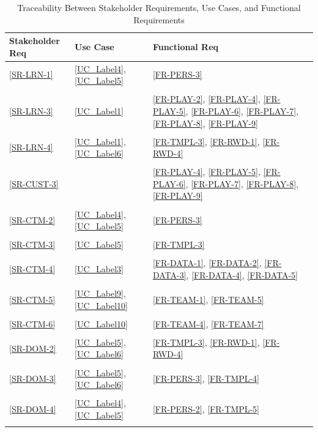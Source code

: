 \documentclass[12pt]{article}
\begin{document}
\begin{longtable}{p{} p{} p{} p{}}

\toprule
Stakeholder Req & Use Case & Functional Req \\
\midrule
\ref{SR-LRN-1} & \ref{UC_Label4}, \ref{UC_Label5} & \ref{FR-PERS-3} \\
\\
\ref{SR-LRN-3} & \ref{UC_Label1} & \ref{FR-PLAY-2}, \ref{FR-PLAY-4}, \ref{FR-PLAY-5}, \ref{FR-PLAY-6}, \ref{FR-PLAY-7}, \ref{FR-PLAY-8}, \ref{FR-PLAY-9} \\
\\
\ref{SR-LRN-4} & \ref{UC_Label1}, \ref{UC_Label6} & \ref{FR-TMPL-3}, \ref{FR-RWD-1}, \ref{FR-RWD-4} \\
\\
\ref{SR-CUST-3} &  & \ref{FR-PLAY-4}, \ref{FR-PLAY-5}, \ref{FR-PLAY-6}, \ref{FR-PLAY-7}, \ref{FR-PLAY-8}, \ref{FR-PLAY-9} \\
\\
\ref{SR-CTM-2} & \ref{UC_Label4}, \ref{UC_Label5} & \ref{FR-PERS-3} \\
\\
\ref{SR-CTM-3} & \ref{UC_Label5} & \ref{FR-TMPL-3} \\
\\
\ref{SR-CTM-4} & \ref{UC_Label3} & \ref{FR-DATA-1}, \ref{FR-DATA-2}, \ref{FR-DATA-3}, \ref{FR-DATA-4}, \ref{FR-DATA-5}\\
\\
\ref{SR-CTM-5} & \ref{UC_Label9}, \ref{UC_Label10} & \ref{FR-TEAM-1}, \ref{FR-TEAM-5} \\
\\
\ref{SR-CTM-6} & \ref{UC_Label10} & \ref{FR-TEAM-4}, \ref{FR-TEAM-7} \\
\\
\ref{SR-DOM-2} & \ref{UC_Label5}, \ref{UC_Label6} & \ref{FR-TMPL-3}, \ref{FR-RWD-1}, \ref{FR-RWD-4} \\
\\
\ref{SR-DOM-3} & \ref{UC_Label5}, \ref{UC_Label6} & \ref{FR-PERS-3}, \ref{FR-TMPL-4} \\
\\
\ref{SR-DOM-4} & \ref{UC_Label4}, \ref{UC_Label5} & \ref{FR-PERS-2}, \ref{FR-TMPL-5} \\
\bottomrule

\caption{Traceability Between Stakeholder Requirements, Use Cases, and
Functional Requirements} \label{tab:SR2UC2FRtm}
\end{longtable}
\end{document}
